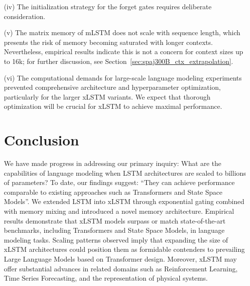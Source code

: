 (iv) The initialization strategy for the forget gates requires deliberate consideration.

(v) The matrix memory of mLSTM does not scale with sequence length, which presents the risk of memory becoming saturated with longer contexts. Nevertheless, empirical results indicate this is not a concern for context sizes up to 16k; for further discussion, see Section~\ref{sec:spaj300B_ctx_extrapolation}.

(vi) The computational demands for large-scale language modeling experiments prevented comprehensive architecture and hyperparameter optimization, particularly for the larger xLSTM variants. We expect that thorough optimization will be crucial for xLSTM to achieve maximal performance.

\section{Conclusion}
We have made progress in addressing our primary inquiry: What are the capabilities of language modeling when LSTM architectures are scaled to billions of parameters? To date, our findings suggest: ``They can achieve performance comparable to existing approaches such as Transformers and State Space Models''. We extended LSTM into xLSTM through exponential gating combined with memory mixing and introduced a novel memory architecture. Empirical results demonstrate that xLSTM models surpass or match state-of-the-art benchmarks, including Transformers and State Space Models, in language modeling tasks. Scaling patterns observed imply that expanding the size of xLSTM architectures could position them as formidable contenders to prevailing Large Language Models based on Transformer design. Moreover, xLSTM may offer substantial advances in related domains such as Reinforcement Learning, Time Series Forecasting, and the representation of physical systems.

